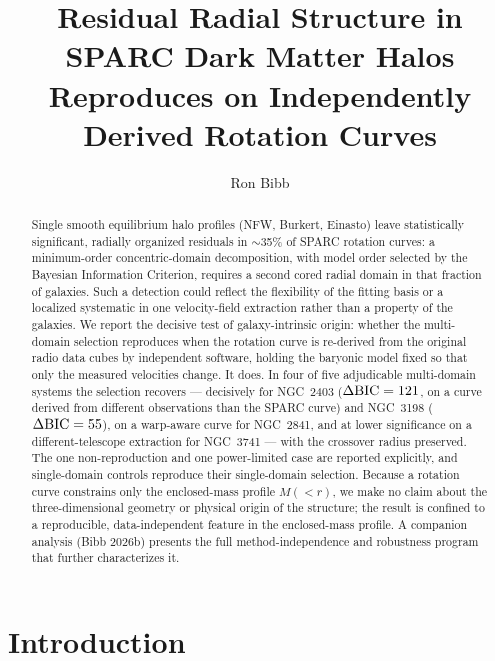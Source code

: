 \documentclass[twocolumn]{aastex701}
\newcommand{\dbic}{\Delta{\rm BIC}}
\begin{document}
\title{Residual Radial Structure in SPARC Dark Matter Halos Reproduces on
Independently Derived Rotation Curves}

\author[0009-0004-1153-2464]{Ron Bibb}

\begin{abstract}
Single smooth equilibrium halo profiles (NFW, Burkert, Einasto) leave
statistically significant, radially organized residuals in $\sim$35\% of SPARC
rotation curves: a minimum-order concentric-domain decomposition, with model
order selected by the Bayesian Information Criterion, requires a second cored
radial domain in that fraction of galaxies. Such a detection could reflect the
flexibility of the fitting basis or a localized systematic in one velocity-field
extraction rather than a property of the galaxies. We report the decisive test of
galaxy-intrinsic origin: whether the multi-domain selection reproduces when the
rotation curve is re-derived from the original radio data cubes by independent
software, holding the baryonic model fixed so that only the measured velocities
change. It does. In four of five adjudicable multi-domain systems the selection
recovers --- decisively for NGC~2403 ($\dbic = 121$, on a curve derived from
different observations than the SPARC curve) and NGC~3198 ($\dbic = 55$), on a
warp-aware curve for NGC~2841, and at lower significance on a
different-telescope extraction for NGC~3741 --- with the crossover radius
preserved. The one non-reproduction and one power-limited case are reported
explicitly, and single-domain controls reproduce their single-domain selection.
Because a rotation curve constrains only the enclosed-mass profile $M({<}r)$, we make
no claim about the three-dimensional geometry or physical origin of the structure; the
result is confined to a reproducible, data-independent feature in the enclosed-mass
profile. A companion analysis (Bibb 2026b) presents the full method-independence and
robustness program that further characterizes it.
\end{abstract}


\section{Introduction} \label{sec:intro}
\end{document}
